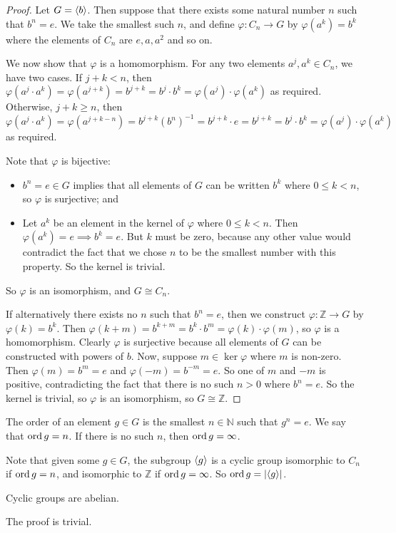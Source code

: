 \begin{proof}
	Let \(G = \langle{} b \rangle\).
	Then suppose that there exists some natural number \(n\) such that \(b^n = e\).
	We take the smallest such \(n\), and define \(\varphi: C_n \to G\) by \(\varphi(a^k) = b^k\) where the elements of \(C_n\) are \(e, a, a^2\) and so on.

	We now show that \(\varphi\) is a homomorphism.
	For any two elements \(a^j, a^k \in C_n\), we have two cases.
	If \(j + k < n\), then \(\varphi(a^j \cdot a^k) = \varphi(a^{j+k}) = b^{j+k} = b^j \cdot b^k = \varphi(a^j) \cdot \varphi(a^k)\) as required.
	Otherwise, \(j + k \geq n\), then \(\varphi(a^j \cdot a^k) = \varphi(a^{j+k-n}) = b^{j+k}(b^n)^{-1} = b^{j+k}\cdot e = b^{j+k} = b^j \cdot b^k = \varphi(a^j) \cdot \varphi(a^k)\) as required.

	Note that \(\varphi\) is bijective:
	\begin{itemize}
		\item \(b^n = e \in G\) implies that all elements of \(G\) can be written \(b^k\) where \(0 \leq k < n\), so \(\varphi\) is surjective; and
		\item Let \(a^k\) be an element in the kernel of \(\varphi\) where \(0 \leq k < n\).
		      Then \(\varphi(a^k) = e \implies b^k = e\).
		      But \(k\) must be zero, because any other value would contradict the fact that we chose \(n\) to be the smallest number with this property.
		      So the kernel is trivial.
	\end{itemize}
	So \(\varphi\) is an isomorphism, and \(G \cong C_n\).

	If alternatively there exists no \(n\) such that \(b^n = e\), then we construct \(\varphi: \mathbb Z \to G\) by \(\varphi(k) = b^k\).
	Then \(\varphi(k + m) = b^{k+m} = b^k \cdot b^m = \varphi(k) \cdot \varphi(m)\), so \(\varphi\) is a homomorphism.
	Clearly \(\varphi\) is surjective because all elements of \(G\) can be constructed with powers of \(b\).
	Now, suppose \(m \in \ker \varphi\) where \(m\) is non-zero.
	Then \(\varphi(m) = b^m = e\) and \(\varphi(-m) = b^{-m} = e\).
	So one of \(m\) and \(-m\) is positive, contradicting the fact that there is no such \(n>0\) where \(b^n = e\).
	So the kernel is trivial, so \(\varphi\) is an isomorphism, so \(G \cong \mathbb Z\).
\end{proof}

\begin{definition}
	The order of an element \(g\in G\) is the smallest \(n \in \mathbb N\) such that \(g^n = e\).
	We say that \(\operatorname{ord} g = n\).
	If there is no such \(n\), then \(\operatorname{ord} g = \infty\).
\end{definition}
Note that given some \(g \in G\), the subgroup \(\langle{} g \rangle\) is a cyclic group isomorphic to \(C_n\) if \(\operatorname{ord} g = n\), and isomorphic to \(\mathbb Z\) if \(\operatorname{ord} g = \infty\).
So \(\operatorname{ord} g = \abs{\langle{} g \rangle}\).
\begin{proposition}
	Cyclic groups are abelian.
\end{proposition}
The proof is trivial.

